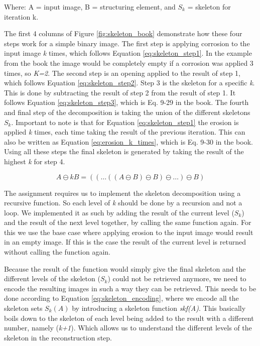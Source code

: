 \documentclass{article}
\begin{document}
Where: A = input image, B = structuring element, and $S_k$ = skeleton for iteration k.

The first 4 columns of Figure \ref{fig:skeleton_book} demonstrate how these four steps work for a simple binary image. The first step is applying corrosion to the input image \textit{k} times, which follows Equation \ref{eq:skeleton_step1}. In the example from the book the image would be completely empty if a corrosion was applied 3 times, so \textit{K=2}. The second step is an opening applied to the result of step 1, which follows Equation \ref{eq:skeleton_step2}. Step 3 is the skeleton for a specific \textit{k}. This is done by subtracting the result of step 2 from the result of step 1. It follows Equation \ref{eq:skeleton_step3}, which is Eq. 9-29 in the book. The fourth and final step of the decomposition is taking the union of the different skeletons $S_k$. Important to note is that for Equation \ref{eq:skeleton_step1} the erosion is applied \textit{k} times, each time taking the result of the previous iteration. This can also be written as Equation \ref{eq:erosion_k_times}, which is Eq. 9-30 in the book. Using all these steps the final skeleton is generated by taking the result of the highest \textit{k} for step 4.

\begin{equation}\label{eq:erosion_k_times}
    A \ominus k B = ((\dots((A \ominus B) \ominus B) \ominus \dots) \ominus B)
\end{equation}

The assignment requires us to implement the skeleton decomposition using a recursive function. So each level of \textit{k} should be done by a recursion and not a loop. We implemented it as such by adding the result of the current level ($S_k$) and the result of the next level together, by calling the same function again. For this we use the base case where applying erosion to the input image would result in an empty image. If this is the case the result of the current level is returned without calling the function again.

Because the result of the function would simply give the final skeleton and the different levels of the skeleton ($S_k$) could not be retrieved anymore, we need to encode the resulting images in such a way they can be retrieved. This needs to be done according to Equation \ref{eq:skeleton_encoding}, where we encode all the skeleton sets $S_k(A)$ by introducing a skeleton function \textit{skf(A)}. This basically boils down to the skeleton of each level being added to the result with a different number, namely (\textit{k+1}). Which allows us to understand the different levels of the skeleton in the reconstruction step.
\end{document}

